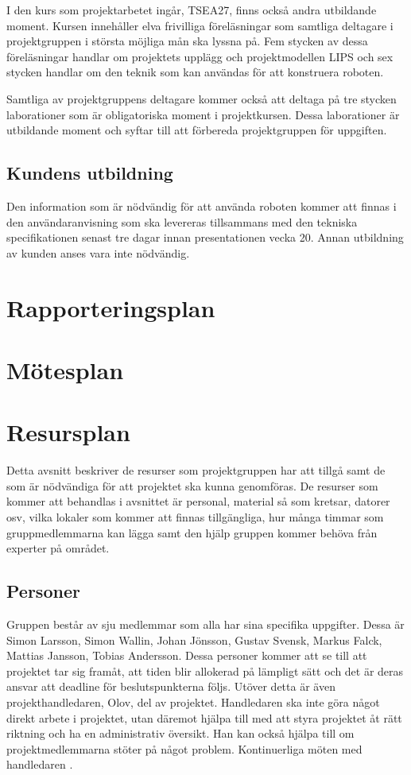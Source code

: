 \documentclass[a4paper,12pt]{article}
\begin{document}
I den kurs som projektarbetet ingår, TSEA27, finns också andra utbildande moment. Kursen innehåller elva frivilliga föreläsningar som samtliga deltagare i projektgruppen i största möjliga mån ska lyssna på. Fem stycken av dessa föreläsningar handlar om projektets upplägg och projektmodellen LIPS och sex stycken handlar om den teknik som kan användas för att konstruera roboten.

Samtliga av projektgruppens deltagare kommer också att deltaga på tre stycken laborationer som är obligatoriska moment i projektkursen. Dessa laborationer är utbildande moment och syftar till att förbereda projektgruppen för uppgiften.


\subsection{Kundens utbildning}
Den information som är nödvändig för att använda roboten kommer att finnas i den användaranvisning som ska levereras tillsammans med den tekniska specifikationen senast tre dagar innan presentationen vecka 20. Annan utbildning av kunden anses vara inte nödvändig.


\section{Rapporteringsplan}

\section{Mötesplan}

\section{Resursplan}	%
Detta avsnitt beskriver de resurser som projektgruppen har att tillgå samt de som är nödvändiga för att projektet ska kunna genomföras. De resurser som kommer att behandlas i avsnittet är personal, material så som kretsar, datorer osv, vilka lokaler som kommer att finnas tillgängliga, hur många timmar som gruppmedlemmarna kan lägga samt den hjälp gruppen kommer behöva från experter på området. 
\subsection{Personer}
Gruppen består av sju medlemmar som alla har sina specifika uppgifter. Dessa är Simon Larsson, Simon Wallin, Johan Jönsson, Gustav Svensk, Markus Falck, Mattias Jansson, Tobias Andersson. Dessa personer kommer att se till att projektet tar sig framåt, att tiden blir allokerad på lämpligt sätt och det är deras ansvar att deadline för beslutspunkterna följs. Utöver detta är även projekthandledaren, Olov, del av projektet. Handledaren ska inte göra något direkt arbete i projektet, utan däremot hjälpa till med att styra projektet åt rätt riktning och ha en administrativ översikt. Han kan också hjälpa till om projektmedlemmarna stöter på något problem. Kontinuerliga möten med handledaren .
\end{document}
